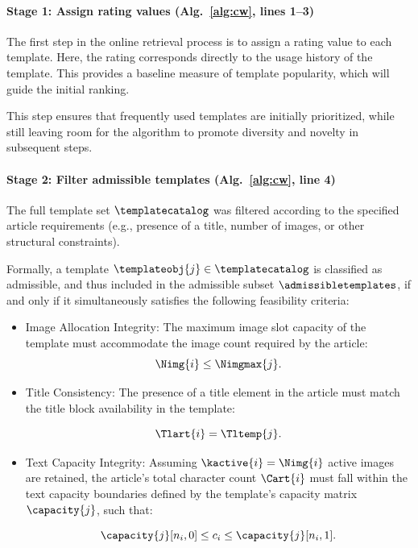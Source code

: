 \paragraph{Stage 1: Assign rating values (Alg.~\ref{alg:cw}, lines 1--3)}
The first step in the online retrieval process is to assign a rating value to each template. Here, the rating corresponds directly to the usage history of the template. This provides a baseline measure of template popularity, which will guide the initial ranking.

This step ensures that frequently used templates are initially prioritized, while still leaving room for the algorithm to promote diversity and novelty in subsequent steps.

\paragraph{Stage 2: Filter admissible templates (Alg.~\ref{alg:cw}, line 4)}

The full template set $\templatecatalog$ was filtered according to the specified article requirements (e.g., presence of a title, number of images, or other structural constraints).

Formally, a template $\templateobj{j} \in \templatecatalog$ is classified as admissible, and thus included in the admissible subset $\admissibletemplates$, if and only if it simultaneously satisfies the following feasibility criteria:
\begin{itemize}
\item Image Allocation Integrity: The maximum image slot capacity of the template must accommodate the image count required by the article:
\begin{equation}
    \Nimg{i} \leq \Nimgmax{j}.
\end{equation}

\item Title Consistency: The presence of a title element in the article must match the title block availability in the template:

\begin{equation}
\Tlart{i} = \Tltemp{j}.
\end{equation}

\item Text Capacity Integrity: Assuming $\kactive{i} = \Nimg{i}$ active images are retained, the article's total character count $\Cart{i}$ must fall within the text capacity boundaries defined by the template's capacity matrix $\capacity{j}$, such that:  

\begin{equation}
    \capacity{j}[n_i, 0] \le c_i \le \capacity{j}[n_i, 1].
\end{equation}

\end{itemize}


